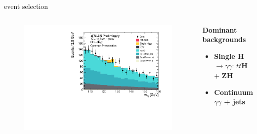 \begin{frame}{event selection}
\begin{columns}
\begin{figure}
    \centering
    \includegraphics[width=1.1\textwidth]{Part3/Img/myy_common.pdf}
\end{figure}
\begin{center}
\textbf{Dominant backgrounds}
\begin{itemize}
    \item \textbf{\textcolor{HHyellow}{Single H$\to\gamma\gamma$}}: \textbf{$t\bar{t}$H} + \textbf{ZH} 
    \item \textcolor{HHturquoise_m}{\textbf{Continuum $\gamma\gamma$ + jets}}
\end{itemize}

\end{center}

\end{columns}

\end{frame}

